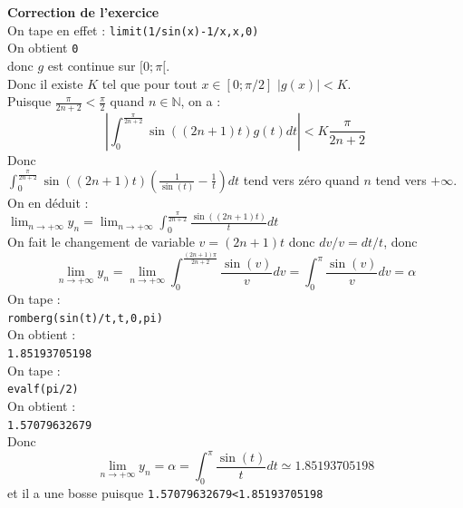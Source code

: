 \documentclass[a4paper,11pt]{book}
\newcommand{\N}{{\mathbb{N}}}
\begin{document}
\begin{enumerate}
{\bf Correction de l'exercice}\\
On tape en effet : 
{\tt limit(1/sin(x)-1/x,x,0)}\\
On obtient {\tt 0} \\
donc $g$ est continue sur $[0;\pi[$.\\
Donc il existe $K$ tel que pour tout $x\in [0;\pi/2]$ $|g(x)|<K$.\\
Puisque $\displaystyle \frac{\pi}{2n+2}<\frac{\pi}{2}$ quand $n\in \N$, on a :
$$ |\int_0^{\frac{\pi}{2n+2}}\sin((2n+1)t)g(t)dt|<K\frac{\pi}{2n+2}$$ 
Donc\\
$\displaystyle \int_0^{\frac{\pi}{2n+2}}\sin((2n+1)t)(\frac{1}{\sin(t)}-\frac{1}{t})dt$ tend vers z\'ero quand $n$ tend vers $+\infty$.\\
On en d\'eduit :\\
$\displaystyle \lim_{n\rightarrow +\infty}y_n=\lim_{n\rightarrow +\infty}\int_0^{\frac{\pi}{2n+2}}\frac{\sin((2n+1)t)}{t}dt$\\
On fait le changement de variable $v=(2n+1)t$ donc $dv/v=dt/t$, donc\\
$$ \lim_{n\rightarrow +\infty}y_n=\lim_{n\rightarrow +\infty}\int_0^{\frac{(2n+1)\pi}{2n+2}} \frac{\sin(v)}{v}dv=\int_0^\pi \frac{\sin(v)}{v}dv=\alpha$$                     
On tape :\\
{\tt romberg(sin(t)/t,t,0,pi)}\\
On obtient :\\
{\tt 1.85193705198}\\
On tape :\\
{\tt evalf(pi/2)}\\
On obtient :\\
{\tt 1.57079632679}\\
Donc 
$$\lim_{n\rightarrow +\infty}y_n=\alpha=\int_0^\pi \frac{\sin(t)}{t}dt\simeq1.85193705198$$
et il a une bosse puisque {\tt 1.57079632679<1.85193705198} 
\end{enumerate}
\end{document}
